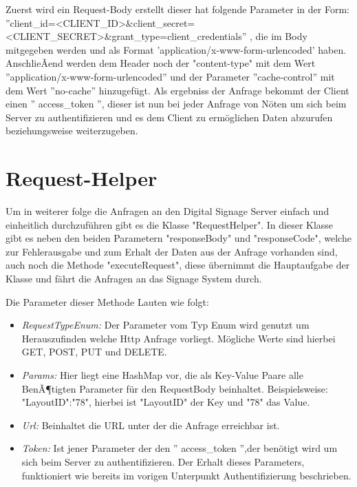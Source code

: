 Zuerst wird ein Request-Body erstellt dieser hat folgende Parameter in der Form: 
 ''client\_id=<CLIENT\_ID>\&client\_secret=<CLIENT\_SECRET>\&grant\_type=client\_credentials''
, die im Body mitgegeben werden und als Format 'application/x-www-form-urlencoded'  haben. AnschlieÃend werden dem Header noch der "content-type" mit dem Wert ''application/x-www-form-urlencoded'' und der Parameter ''cache-control'' mit dem Wert ''no-cache'' hinzugefügt. Als ergebniss der Anfrage bekommt der Client einen '' access\_token '', dieser ist nun bei jeder Anfrage von Nöten um sich beim Server zu authentifizieren und es dem Client zu ermöglichen Daten abzurufen beziehungsweise weiterzugeben.

\section{Request-Helper}
Um in weiterer folge die Anfragen an den Digital Signage Server einfach und einheitlich durchzuführen gibt es die Klasse "RequestHelper". In dieser Klasse gibt es neben den beiden Parametern "responseBody" und "responseCode", welche zur Fehlerausgabe und zum Erhalt der Daten aus der Anfrage vorhanden sind, auch noch die Methode "executeRequest", diese übernimmt die Hauptaufgabe der Klasse und fährt die Anfragen an das Signage System durch.

Die Parameter dieser Methode Lauten wie folgt:

\begin{itemize}
	\item {\em RequestTypeEnum:} Der Parameter vom Typ Enum wird genutzt um Herauszufinden welche Http Anfrage vorliegt. Mögliche Werte sind hierbei GET, POST, PUT und DELETE.
	
	\item {\em Params:} Hier liegt eine HashMap vor, die als Key-Value Paare alle BenÃ¶tigten Parameter für den RequestBody beinhaltet. Beispielsweise: "LayoutID":"78", hierbei ist "LayoutID" der Key und "78" das Value.
		
	\item {\em Url:} Beinhaltet die URL unter der die Anfrage erreichbar ist. 
	
	\item {\em Token:} Ist jener Parameter der den '' access\_token '',der benötigt wird um sich beim Server zu authentifizieren. Der Erhalt dieses Parameters, funktioniert wie bereits im vorigen Unterpunkt Authentifizierung beschrieben.
	
\end{itemize}

